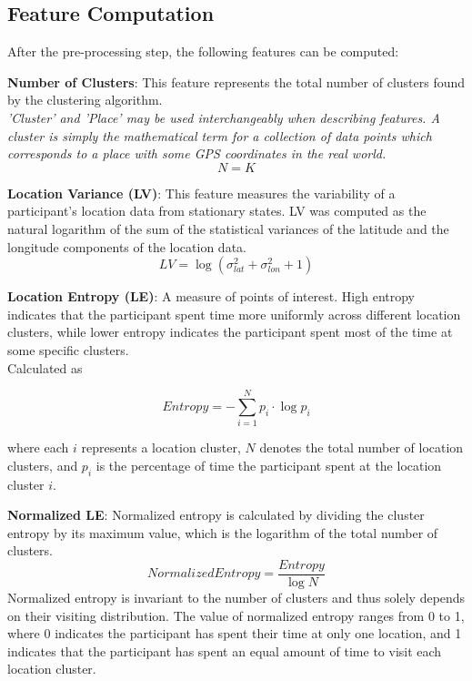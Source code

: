\subsection{Feature Computation}
After the pre-processing step, the following features can be computed:

\textbf{Number of Clusters}: This feature represents the total number of clusters found by the clustering algorithm.\\
\textit{'Cluster' and 'Place' may be used interchangeably when describing features. A cluster is simply the mathematical term for a collection of data points which corresponds to a place with some GPS coordinates in the real world.}\\

$$N = K$$

\textbf{Location Variance (LV)}: This feature measures the variability of a participant’s location data from stationary states. LV was computed as the natural logarithm of the sum of the statistical variances of the latitude and the longitude components of the location data.\\

$$LV = \log (\sigma^2_{lat} + \sigma^2_{lon} + 1) $$

\textbf{Location Entropy (LE)}: A measure of points of interest. High
entropy indicates that the participant spent time more uniformly across different location
clusters, while lower entropy indicates the participant spent most of the time at some
specific clusters.\\
Calculated as 

$$Entropy = - \sum_{i=1}^N p_i \cdot \log p_i$$

where each $i$ represents a location cluster, $N$ denotes the total number of location clusters, and $p_i$ is the percentage of time the participant spent at the location cluster $i$. 

\textbf{Normalized LE}: Normalized entropy is calculated by dividing the cluster entropy by its maximum value, which is the logarithm of the total number of clusters. 
$$Normalized Entropy = \frac{Entropy}{\log N}$$
Normalized entropy is invariant to the number of clusters and thus solely depends on their visiting distribution. The value of normalized entropy ranges from 0 to 1, where 0 indicates the participant has spent their time at only one location, and 1 indicates that the participant has spent an equal amount of time to visit each location cluster.\\

